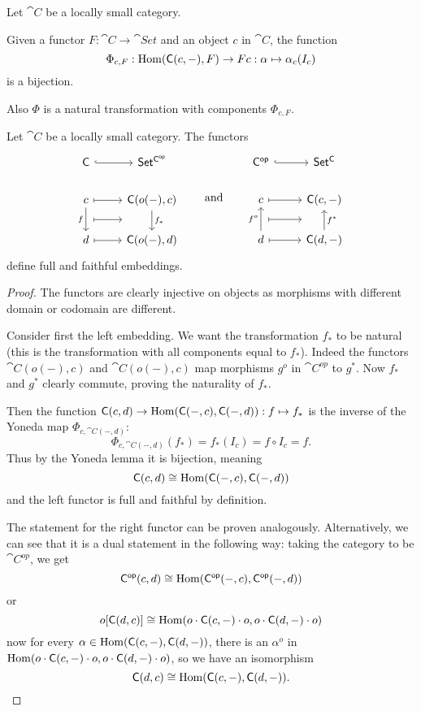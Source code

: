 \begin{theorem} \label{theorem:YonedaLemma}
Let $\cat{C}$ be a locally small category.

Given a functor $F: \cat{C} \to \cat{Set}$ and an object $c$ in $\cat{C}$, the function
\[ \Phi_{c,F}: \operatorname{Hom}(\mathsf{C}(c,-), F) \to Fc: \alpha \mapsto \alpha_c(I_c) \]
is a bijection.

Also $\Phi$ is a natural transformation with components $\Phi_{c,F}$.
\end{theorem}
\begin{corollary} \label{corollary:YonedaEmbedding}
Let $\cat{C}$ be a locally small category. The functors
\[ \begin{tikzcd}
\cat{C} \ar[r, hook] & \cat{Set^{C^{op}}} \\
c \ar[d, swap, "f"]\ar[r, mapsto] \ar[r,mapsto, shift right=1.7em] & \cat{C}(o(-),c) \ar[d, "f_*"] \\
d \ar[r,mapsto] & \cat{C}(o(-),d)
\end{tikzcd} \qquad\text{and}\qquad \begin{tikzcd}
\cat{C^{op}} \ar[r, hook] & \cat{Set^C} \\
c \ar[r, mapsto] \ar[r,mapsto, shift right=1.7em] & \cat{C}(c,-) \\
d \ar[u, "f^o"] \ar[r,mapsto] & \cat{C}(d,-) \ar[u, swap, "f^*"]
\end{tikzcd} \]
define full and faithful embeddings.
\end{corollary}
\begin{proof}
The functors are clearly injective on objects as morphisms with different domain or codomain are different.

Consider first the left embedding. We want the transformation $f_*$ to be natural (this is the transformation with all components equal to $f_*$). Indeed the functors $\cat{C}(o(-),c)$ and $\cat{C}(o(-),c)$ map morphisms $g^o$ in $\cat{C^{op}}$ to $g^*$. Now $f_*$ and $g^*$ clearly commute, proving the naturality of $f_*$.

Then the function $\mathsf{C}(c,d) \to \operatorname{Hom}(\mathsf{C}(-,c),\mathsf{C}(-,d)): f\mapsto f_*$ is the inverse of the Yoneda map $\Phi_{c,\cat{C}(-,d)}$:
\[ \Phi_{c,\cat{C}(-,d)}(f_*) = f_*(I_c) = f\circ I_c = f. \]
Thus by the Yoneda lemma it is bijection, meaning
\[ \mathsf{C}(c,d) \cong \operatorname{Hom}(\mathsf{C}(-,c),\mathsf{C}(-,d)) \]
and the left functor is full and faithful by definition.

The statement for the right functor can be proven analogously. Alternatively, we can see that it is a dual statement in the following way: taking the category to be $\cat{C^{op}}$, we get
\[ \mathsf{C^{op}}(c,d) \cong \operatorname{Hom}(\mathsf{C^{op}}(-,c),\mathsf{C^{op}}(-,d)) \]
or
\[ o[\mathsf{C}(d,c)] \cong \operatorname{Hom}(o\cdot\mathsf{C}(c,-)\cdot o,o\cdot\mathsf{C}(d,-)\cdot o) \]
now for every $\alpha \in \operatorname{Hom}(\mathsf{C}(c,-),\mathsf{C}(d,-))$, there is an $\alpha^o$ in $\operatorname{Hom}(o\cdot\mathsf{C}(c,-)\cdot o,o\cdot\mathsf{C}(d,-)\cdot o)$, so we have an isomorphism
\[ \mathsf{C}(d,c) \cong \operatorname{Hom}(\mathsf{C}(c,-),\mathsf{C}(d,-)). \]
\end{proof}


